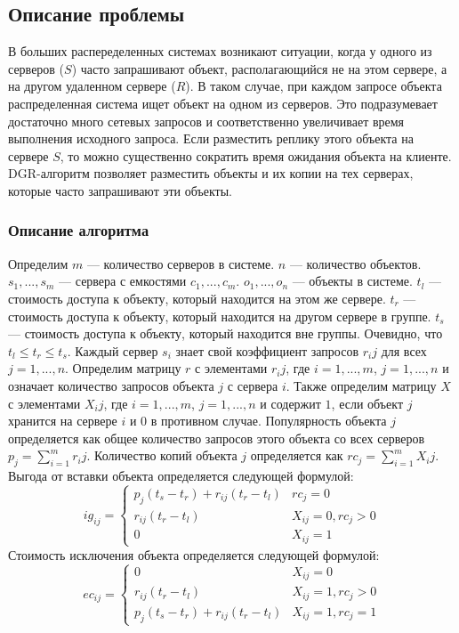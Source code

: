 		\subsection{Описание проблемы}
			В больших распеределенных системах возникают ситуации, когда у одного из серверов ($S$) часто запрашивают объект,
			располагающийся не на этом сервере, а на другом удаленном сервере ($R$). В таком случае, при каждом запросе объекта
			распределенная система ищет объект на одном из серверов. Это подразумевает достаточно много сетевых запросов и 
			соответственно увеличивает время выполнения исходного запроса. Если разместить реплику этого объекта на сервере $S$,
			то можно существенно сократить время ожидания объекта на клиенте. DGR-алгоритм позволяет разместить объекты и их
			копии на тех серверах, которые часто запрашивают эти объекты. 

		\subsubsection{Описание алгоритма}
			Определим $m$ --- количество серверов в системе. $n$ --- количество объектов. $s_1, ..., s_m$ --- сервера с емкостями
			$c_1, ..., c_m$. $o_1, ..., o_n$ --- объекты в системе. $t_l$ --- стоимость доступа к объекту, который находится на 
			этом же сервере. $t_r$ --- стоимость доступа к объекту, который находится на другом сервере в группе. $t_s$ --- стоимость 
			доступа к объекту, который находится вне группы. Очевидно, что $t_l \leq t_r \leq t_s$. Каждый сервер $s_i$ знает свой
			коэффициент запросов $r_ij$ для всех $j = 1, ..., n$. Определим матрицу $r$ с элементами $r_ij$, где $i = 1, ..., m$,
			$j = 1, ..., n$ и означает количество запросов объекта $j$ с сервера $i$. Также определим матрицу $X$ с элементами 
			$X_ij$, где $i = 1, ..., m$, $j = 1, ..., n$ и содержит $1$, если объект $j$ хранится на сервере $i$ и $0$  в противном случае.
			Популярность объекта $j$ определяется как общее количество запросов этого объекта со всех серверов $p_j = \sum_{i=1}^{m} r_ij$.
			Количество копий объекта $j$ определяется как $rc_j = \sum_{i=1}^{m} X_ij$.
			Выгода от вставки объекта определяется следующей формулой: 
			 \[ 	
				ig_{ij} =
				\begin{cases} 
			 		p_j (t_s - t_r) + r_{ij} (t_r - t_l) 	& rc_j = 0 \\
			 		r_{ij} (t_r - t_l) 						& X_{ij} = 0, rc_j > 0 \\
			 		0 										    & X_{ij} = 1 
			  	\end{cases}
			 \]
			Стоимость исключения объекта определяется следующей формулой:
			\[ 	
				ec_{ij} =
				\begin{cases} 
					0										& X_{ij} = 0 \\
					r_{ij} (t_r - t_l) 						& X_{ij} = 1, rc_j > 0 \\
					p_j (t_s - t_r) + r_{ij} (t_r - t_l)	& X_{ij} = 1, rc_j = 1 
			 	\end{cases}
			\]


